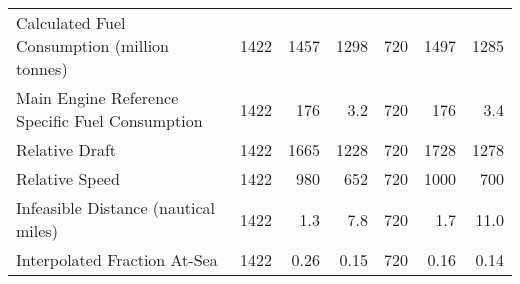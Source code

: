 \begin{tabular}[t]{lrrrrrr}
Calculated Fuel Consumption (million tonnes) & 1422 & 1457 & 1298 & 720 & 1497 & 1285\\
Main Engine Reference Specific Fuel Consumption & 1422 & 176 & 3.2 & 720 & 176 & 3.4\\
Relative Draft & 1422 & 1665 & 1228 & 720 & 1728 & 1278\\
Relative Speed & 1422 & 980 & 652 & 720 & 1000 & 700\\
\addlinespace
Infeasible Distance (nautical miles) & 1422 & 1.3 & 7.8 & 720 & 1.7 & 11.0\\
Interpolated Fraction At-Sea & 1422 & 0.26 & 0.15 & 720 & 0.16 & 0.14\\
\bottomrule
\end{tabular}
